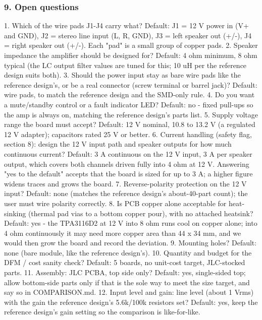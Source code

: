\documentclass[11pt,a4paper]{article}
\begin{document}
\subsubsection*{9. Open questions}
1. Which of the wire pads J1-J4 carry what? Default: J1 = 12 V power in (V+ and GND), J2 = stereo line input (L, R, GND), J3 = left speaker out (+/-), J4 = right speaker out (+/-). Each "pad" is a small group of copper pads. 2. Speaker impedance the amplifier should be designed for? Default: 4 ohm minimum, 8 ohm typical (the LC output filter values are tuned for this; 10 uH per the reference design suits both). 3. Should the power input stay as bare wire pads like the reference design's, or be a real connector (screw terminal or barrel jack)? Default: wire pads, to match the reference design and the SMD-only rule. 4. Do you want a mute/standby control or a fault indicator LED? Default: no - fixed pull-ups so the amp is always on, matching the reference design's parts list. 5. Supply voltage range the board must accept? Default: 12 V nominal, 10.8 to 13.2 V (a regulated 12 V adapter); capacitors rated 25 V or better. 6. Current handling (safety flag, section 8): design the 12 V input path and speaker outputs for how much continuous current? Default: 3 A continuous on the 12 V input, 3 A per speaker output, which covers both channels driven fully into 4 ohm at 12 V. Answering "yes to the default" accepts that the board is sized for up to 3 A; a higher figure widens traces and grows the board. 7. Reverse-polarity protection on the 12 V input? Default: none (matches the reference design's about-40-part count); the user must wire polarity correctly. 8. Is PCB copper alone acceptable for heat-sinking (thermal pad vias to a bottom copper pour), with no attached heatsink? Default: yes - the TPA3116D2 at 12 V into 8 ohm runs cool on copper alone; into 4 ohm continuously it may need more copper area than 44 x 34 mm, and we would then grow the board and record the deviation. 9. Mounting holes? Default: none (bare module, like the reference design's). 10. Quantity and budget for the DFM / cost sanity check? Default: 5 boards, no unit-cost target, JLC-stocked parts. 11. Assembly: JLC PCBA, top side only? Default: yes, single-sided top; allow bottom-side parts only if that is the sole way to meet the size target, and say so in COMPARISON.md. 12. Input level and gain: line level (about 1 Vrms) with the gain the reference design's 5.6k/100k resistors set? Default: yes, keep the reference design's gain setting so the comparison is like-for-like.
\end{document}

